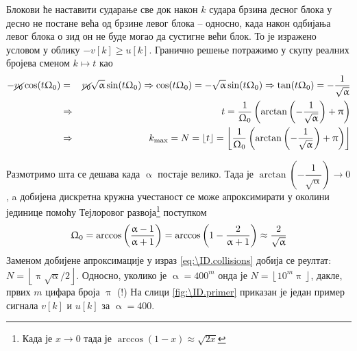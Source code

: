 Блокови ће наставити сударање све док након $k$ судара брзина десног блока у десно не постане
већа од брзине левог блока -- односно, када након одбијања левог блока о зид он не буде могао да 
сустигне већи блок. То је изражено условом у облику $- v[k] \geq u[k]$.  Гранично решење потражимо
у скупу реалних бројева сменом $k \mapsto t$ као
\begin{eqnarray}
    - \cancel{v_0} \cos(t\Upomega_0) & = & \cancel{v_0} \sqrt{\upalpha} \sin(t\Upomega_0)
    \Rightarrow
    \cos(t\Upomega_0) = -\sqrt{\upalpha} \sin(t\Upomega_0) \Rightarrow 
    \tan(t\Upomega_0) = -\dfrac{1}{\sqrt{\upalpha}}
    \\
    & \Rightarrow & t = \dfrac{1}{\Upomega_0} 
    \left( \arctan\left(-\dfrac1{\sqrt{\upalpha}} \right) + \uppi \right)
    \\
    & \Rightarrow & k_\mr{max} = N = \lfloor t \rfloor = \left\lfloor \dfrac{1}{\Upomega_0} \left( \arctan\left(
        -\dfrac1{\sqrt{\upalpha}} \right) + \uppi \right) \right\rfloor
        \label{eq:\ID.collisions}
\end{eqnarray}

Размотримо шта се дешава када $\upalpha$ постаје велико. Тада је 
$\arctan \left(- \dfrac1{\sqrt{\upalpha}} \right) 
\to 0$, a добијена дискретна кружна учестаност се може апроксимирати у околини јединице
помоћу Тејлоровог развоја\footnote{Када је $x\to 0$ тада је $\arccos(1 - x) \approx \sqrt{2x}$} поступком
\begin{equation}
    \Upomega_0 = \arccos\left( \dfrac{\upalpha-1}{\upalpha+1} \right)
    = \arccos\left( 1 - \dfrac{2}{\upalpha+1} \right)
    \approx \dfrac{2}{\sqrt{ \upalpha }}
\end{equation}
Заменом добијене апроксимације у израз \ref{eq:\ID.collisions} добија се реултат:
$N = \left\lfloor \uppi \sqrt{\upalpha}/2 \right\rfloor$. \vspace{1mm} 
Односно, уколико је $\upalpha = 400^m$ онда је 
$N = \left\lfloor 10^m \uppi \right\rfloor$, дакле, првих $m$ цифара броја $\uppi$ (!)
На слици \ref{fig:\ID.primer} приказан је један пример сигнала $v[k]$ и $u[k]$ за 
$\upalpha = 400$. 
